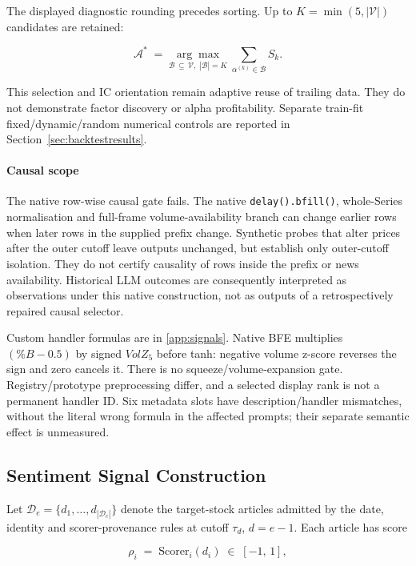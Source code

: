 The displayed diagnostic rounding precedes sorting. Up to $K=\min(5,|\mathcal{V}|)$ candidates are retained:

\begin{equation}
    \mathcal{A}^{*} \;=\;
    \underset{\mathcal{B}\,\subseteq\,\mathcal{V},\;|\mathcal{B}|=K}
    {\arg\max}
    \;\sum_{\alpha^{(k)} \in \mathcal{B}} S_k.
    \label{eq:selection}
\end{equation}


This selection and IC orientation remain adaptive reuse of trailing data. They do not demonstrate factor discovery or alpha profitability. Separate train-fit fixed/dynamic/random numerical controls are reported in Section~\ref{sec:backtestresults}.

\paragraph{Causal scope}
The native row-wise causal gate fails. The native \texttt{delay().bfill()}, whole-Series normalisation and full-frame volume-availability branch can change earlier rows when later rows in the supplied prefix change. Synthetic probes that alter prices after the outer cutoff leave outputs unchanged, but establish only outer-cutoff isolation. They do not certify causality of rows inside the prefix or news availability. Historical LLM outcomes are consequently interpreted as observations under this native construction, not as outputs of a retrospectively repaired causal selector.

Custom handler formulas are in \ref{app:signals}. Native BFE multiplies $(\%B-0.5)$ by signed $VolZ_5$ before tanh: negative volume z-score reverses the sign and zero cancels it. There is no squeeze/volume-expansion gate. Registry/prototype preprocessing differ, and a selected display rank is not a permanent handler ID. Six metadata slots have description/handler mismatches, without the literal wrong formula in the affected prompts; their separate semantic effect is unmeasured.

\subsection{Sentiment Signal Construction}
Let $\mathcal{D}_e=\{d_1,\ldots,d_{|\mathcal{D}_e|}\}$ denote the target-stock articles admitted by the date, identity and scorer-provenance rules at cutoff $\tau_d$, $d=e-1$. Each article has score

\begin{equation}
    \rho_i \;=\; \mathrm{Scorer}_i(d_i) \;\in\; [-1,\, 1],
\end{equation}


